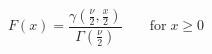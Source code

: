 

\[
F(x) = \frac{\gamma(\frac{\nu} {2},\frac{x} {2})} {\Gamma(\frac{\nu} {2})} \;\;\;\;\;\;\; \mbox{for} \; x \ge 0
\]



